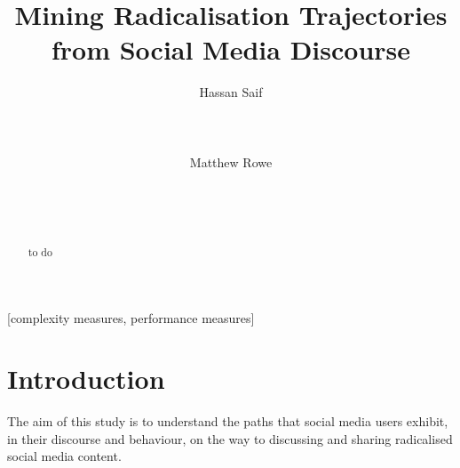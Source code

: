 \documentclass{acm_proc_article-sp}
\begin{document}
\title{Mining Radicalisation Trajectories from Social Media Discourse}

%
\author{
%
%
\alignauthor
Hassan Saif\\
       \\
       \\
       \\
\alignauthor
Matthew Rowe\\
       \\
       \\
       \\
}

\maketitle
\begin{abstract}
to do
\end{abstract}

[complexity measures, performance measures]



\section{Introduction}
The aim of this study is to understand the paths that social media users exhibit, in their discourse and behaviour, on the way to discussing and sharing radicalised social media content.
\end{document}
